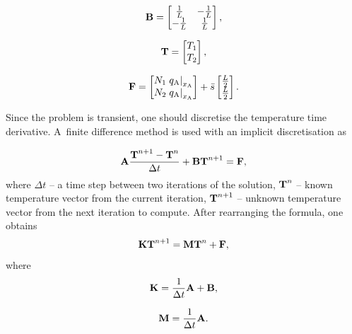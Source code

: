\begin{equation}
    \textbf{B} = 
    \begin{bmatrix}  
    \frac{1}{L} & -\frac{1}{L} \\
    -\frac{1}{L} & \frac{1}{L}
    \end{bmatrix},
\end{equation}

\begin{equation}
    \textbf{T} = 
    \begin{bmatrix}  
    T_1 \\
    T_2
    \end{bmatrix},
\end{equation}

\begin{equation}
    \textbf{F} = 
    \begin{bmatrix}  
    N_1 \left. q_\text{A} \right|_{x_\text{A}} \\
    N_2 \left. q_\text{A} \right|_{x_\text{A}}
    \end{bmatrix} 
    + \bar s 
    \begin{bmatrix}  
    \frac{L}{2} \\
    \frac{L}{2}
    \end{bmatrix}.
\end{equation}

Since the problem is transient, one should discretise the temperature time derivative. A~finite difference method is used with an implicit discretisation as

\begin{equation}
    \textbf{A} \frac{\textbf{T}^{n+1} - \textbf{T}^n}{\Delta t} + \textbf{B} \textbf{T}^{n+1} = \textbf{F},
\end{equation}
where $\Delta t$ -- a time step between two iterations of the solution, $\textbf{T}^n$ -- known temperature vector from the current iteration, $\textbf{T}^{n+1}$ -- unknown temperature vector from the next iteration to compute. After rearranging the formula, one obtains
\begin{equation}
    \textbf{K} \textbf{T}^{n+1} =\textbf{M} \textbf{T}^{n} + \textbf{F},
\end{equation}
where 
\begin{equation}
    \textbf{K} = \frac{1}{\Delta t} \textbf{A} + \textbf{B},
\end{equation}

\begin{equation}
    \textbf{M} = \frac{1}{\Delta t} \textbf{A}.
\end{equation}


